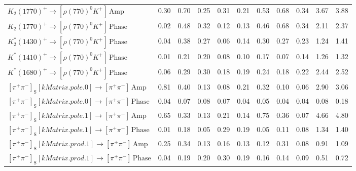 \begin{tabular}{l  c  c  c  c  c  c  c  c  c  | c }
$K_{2}(1770)^{+}\rightarrow \left[\rho(770)^{0}K^{+}\right]\,\text{Amp}$ & 0.30 & 0.70 & 0.25 & 0.31 & 0.21 & 0.53 & 0.68 & 0.34 & 3.67 & 3.88 \\ 
$K_{2}(1770)^{+}\rightarrow \left[\rho(770)^{0}K^{+}\right]\,\text{Phase}$ & 0.02 & 0.48 & 0.32 & 0.12 & 0.13 & 0.46 & 0.68 & 0.34 & 2.11 & 2.37 \\ 
$K_{2}^{*}(1430)^{+}\rightarrow \left[\rho(770)^{0}K^{+}\right]\,\text{Phase}$ & 0.04 & 0.38 & 0.27 & 0.06 & 0.14 & 0.30 & 0.27 & 0.23 & 1.24 & 1.41 \\ 
$K^{*}(1410)^{+}\rightarrow \left[\rho(770)^{0}K^{+}\right]\,\text{Phase}$ & 0.01 & 0.21 & 0.20 & 0.08 & 0.10 & 0.17 & 0.07 & 0.14 & 1.26 & 1.32 \\ 
$K^{*}(1680)^{+}\rightarrow \left[\rho(770)^{0}K^{+}\right]\,\text{Phase}$ & 0.06 & 0.29 & 0.30 & 0.18 & 0.19 & 0.24 & 0.18 & 0.22 & 2.44 & 2.52 \\ 
$\left[\pi^{+}\pi^{-}\right]_{\text{S}}\left[kMatrix.pole.0\right]\rightarrow \left[\pi^{+}\pi^{-}\right]\,\text{Amp}$ & 0.81 & 0.40 & 0.13 & 0.08 & 0.21 & 0.32 & 0.10 & 0.06 & 2.90 & 3.06 \\ 
$\left[\pi^{+}\pi^{-}\right]_{\text{S}}\left[kMatrix.pole.0\right]\rightarrow \left[\pi^{+}\pi^{-}\right]\,\text{Phase}$ & 0.04 & 0.07 & 0.08 & 0.07 & 0.04 & 0.05 & 0.04 & 0.04 & 0.08 & 0.18 \\ 
$\left[\pi^{+}\pi^{-}\right]_{\text{S}}\left[kMatrix.pole.1\right]\rightarrow \left[\pi^{+}\pi^{-}\right]\,\text{Amp}$ & 0.65 & 0.33 & 0.13 & 0.21 & 0.14 & 0.75 & 0.36 & 0.07 & 4.66 & 4.80 \\ 
$\left[\pi^{+}\pi^{-}\right]_{\text{S}}\left[kMatrix.pole.1\right]\rightarrow \left[\pi^{+}\pi^{-}\right]\,\text{Phase}$ & 0.01 & 0.18 & 0.05 & 0.29 & 0.19 & 0.05 & 0.11 & 0.08 & 1.34 & 1.40 \\ 
$\left[\pi^{+}\pi^{-}\right]_{\text{S}}\left[kMatrix.prod.1\right]\rightarrow \left[\pi^{+}\pi^{-}\right]\,\text{Amp}$ & 0.25 & 0.34 & 0.13 & 0.16 & 0.13 & 0.12 & 0.31 & 0.08 & 0.91 & 1.09 \\ 
$\left[\pi^{+}\pi^{-}\right]_{\text{S}}\left[kMatrix.prod.1\right]\rightarrow \left[\pi^{+}\pi^{-}\right]\,\text{Phase}$ & 0.04 & 0.19 & 0.20 & 0.30 & 0.19 & 0.16 & 0.14 & 0.09 & 0.51 & 0.72 \\ 
\hline
\hline
\end{tabular}

